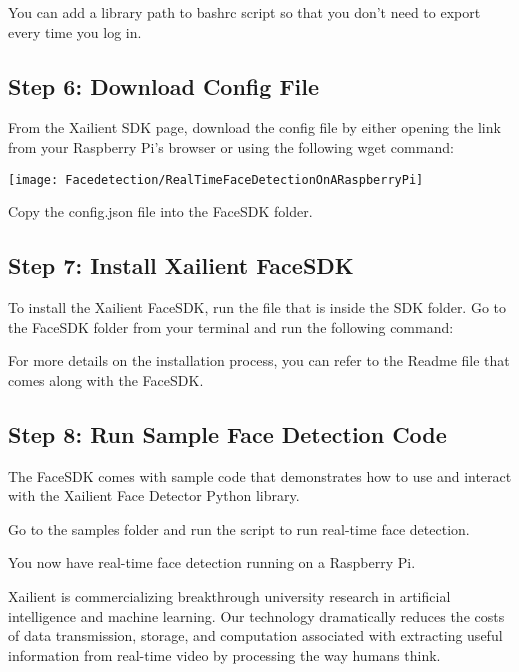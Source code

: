 

    
    You can add a library path to bashrc script so that you don’t need to export every time you log in.



    
\subsection{Step 6: Download Config File}

    From the Xailient SDK page, download the config file by either opening the link from your Raspberry Pi’s browser or using the following wget command:
    

\texttt{[image: Facedetection/RealTimeFaceDetectionOnARaspberryPi]}    
    
    Copy the config.json file into the FaceSDK folder.

    
\subsection{Step 7: Install Xailient FaceSDK}

    To install the Xailient FaceSDK, run the file   that is inside the SDK folder. Go to the FaceSDK folder from your terminal and run the following command: 
    

    For more details on the installation process, you can refer to the Readme file that comes along with the FaceSDK.
    
\subsection{Step 8: Run Sample Face Detection Code}

    The FaceSDK comes with sample code that demonstrates how to use and interact with the Xailient Face Detector Python library.
    
    Go to the samples folder and run the  script to run real-time face detection.
    
    
    You now have real-time face detection running on a Raspberry Pi.
    
    Xailient is commercializing breakthrough university research in artificial intelligence and machine learning. Our technology dramatically reduces the costs of data transmission, storage, and computation associated with extracting useful information from real-time video by processing the way humans think.
    
    